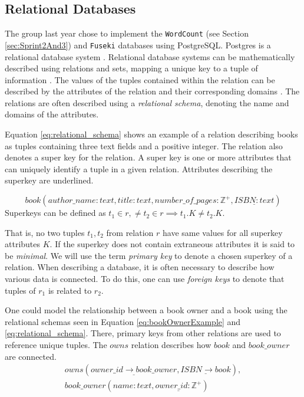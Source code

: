 \subsection{Relational Databases}
The group last year chose to implement the \texttt{WordCount} (see Section \ref{sec:Sprint2And3}) and \texttt{Fuseki} databases using PostgreSQL.
Postgres is a relational database system \cite{knox2020}.
Relational database systems can be mathematically described using relations and sets, mapping a unique key to a tuple of information \cite[Chapter~2.3]{DBSBook}.
The values of the tuples contained within the relation can be described by the attributes of the relation and their corresponding domains \cite{KatjaFirstPP}. 
The relations are often described using a \textit{relational schema}, denoting the name and domains of the attributes.

Equation \ref{eq:relational_schema} shows an example of a relation describing books as tuples containing three text fields and a positive integer.
The relation also denotes a super key for the relation. A super key is one or more attributes that can uniquely identify a tuple in a given relation. Attributes describing the superkey are underlined.

\begin{equation} \label{eq:relational_schema}
    book(author\_name:text, title: text, number\_of\_pages:\mathbb{Z}^+, \underline{ISBN: text})
\end{equation}
Superkeys can be defined as $t_1 \in r,\neq t_2 \in r \implies t_1.K \neq t_2.K$. 

That is, no two tuples $t_1, t_2$ from relation $r$ have same values for all superkey attributes $K$. 
If the superkey does not contain extraneous attributes it is said to be \textit{minimal}. \cite[Chapter 2.3]{DBSBook}
We will use the term \textit{primary key} to denote a chosen superkey of a relation. 
When describing a database, it is often necessary to describe how various data is connected. 
To do this, one can use \textit{foreign keys} to denote that tuples of $r_1$ is related to $r_2$.


One could model the relationship between a book owner and a book using the relational schemas seen in Equation \ref{eq:bookOwnerExample} and \ref{eq:relational_schema}.
There, primary keys from other relations are used to reference unique tuples. The $owns$ relation describes how $book$ and $book\_owner$ are connected. 
\begin{equation}\label{eq:bookOwnerExample}
    \begin{split}
        owns(\underline{owner\_id \rightarrow book\_owner}, \underline{ISBN \rightarrow book}), \\
        book\_owner(name:text,\underline{owner\_id:\mathbb{Z}^+})
    \end{split}
\end{equation}

